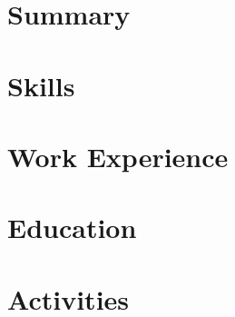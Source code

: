 \documentclass[letter,12pt]{article}
\begin{document}
\section{Summary}


\section{Skills}


\section{Work Experience}


\section{Education}



\section{Activities}

\end{document}
